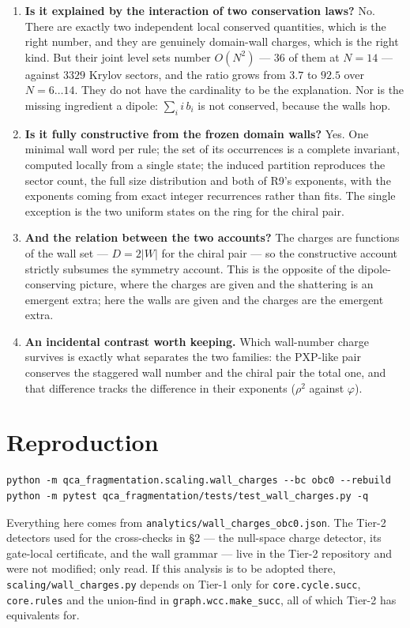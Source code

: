 \documentclass[11pt]{article}
\newcommand{\fn}[1]{\texttt{#1}}
\theoremstyle{plain}
\begin{document}
\begin{enumerate}
\item \textbf{Is it explained by the interaction of two conservation laws?} No.
There are exactly two independent local conserved quantities, which is the right
number, and they are genuinely domain-wall charges, which is the right kind. But
their joint level sets number $O(N^2)$ --- $36$ of them at $N=14$ --- against
$3329$ Krylov sectors, and the ratio grows from $3.7$ to $92.5$ over
$N=6\ldots14$. They do not have the cardinality to be the explanation. Nor is
the missing ingredient a dipole: $\sum_i i\,b_i$ is not conserved, because the
walls hop.

\item \textbf{Is it fully constructive from the frozen domain walls?} Yes. One
minimal wall word per rule; the set of its occurrences is a complete invariant,
computed locally from a single state; the induced partition reproduces the sector
count, the full size distribution and both of R9's exponents, with the exponents
coming from exact integer recurrences rather than fits. The single exception is
the two uniform states on the ring for the chiral pair.

\item \textbf{And the relation between the two accounts?} The charges are
functions of the wall set --- $D = 2|W|$ for the chiral pair --- so the
constructive account strictly subsumes the symmetry account. This is the
opposite of the dipole-conserving picture, where the charges are given and the
shattering is an emergent extra; here the walls are given and the charges are
the emergent extra.

\item \textbf{An incidental contrast worth keeping.} Which wall-number charge
survives is exactly what separates the two families: the PXP-like pair conserves
the staggered wall number and the chiral pair the total one, and that difference
tracks the difference in their exponents ($\rho^2$ against $\varphi$).
\end{enumerate}

\section{Reproduction}

\begin{verbatim}
python -m qca_fragmentation.scaling.wall_charges --bc obc0 --rebuild
python -m pytest qca_fragmentation/tests/test_wall_charges.py -q
\end{verbatim}

\noindent Everything here comes from \fn{analytics/wall\_charges\_obc0.json}.
The Tier-2 detectors used for the cross-checks in \S2 --- the null-space charge
detector, its gate-local certificate, and the wall grammar --- live in the Tier-2
repository and were not modified; only read. If this analysis is to be adopted
there, \fn{scaling/wall\_charges.py} depends on Tier-1 only for
\fn{core.cycle.succ}, \fn{core.rules} and the union-find in
\fn{graph.wcc.make\_succ}, all of which Tier-2 has equivalents for.
\end{document}

